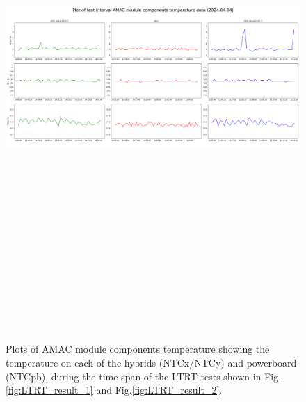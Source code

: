 \begin{figure}
    \centering
    \includegraphics[width=25cm,height=20cm,keepaspectratio]{Figures/results/amac_temp_plot_20240404_.png}
    \caption{Plots of AMAC module components temperature showing the temperature on each of the hybrids (NTCx/NTCy) and powerboard (NTCpb), during the time span of the LTRT tests shown in Fig.\ref{fig:LTRT_result_1} and Fig.\ref{fig:LTRT_result_2}.}
    \label{fig:amac_temp_large}
\end{figure}